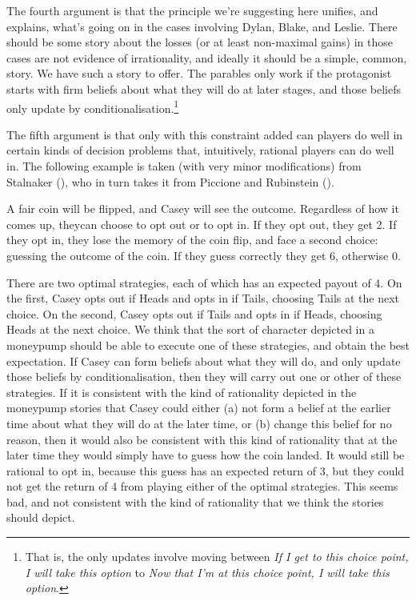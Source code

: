 \documentclass[
  11pt,
  letterpaper,
  DIV=11,
  numbers=noendperiod,
  twoside]{scrartcl}
\begin{document}
The fourth argument is that the principle we're suggesting here unifies,
and explains, what's going on in the cases involving Dylan, Blake, and
Leslie. There should be some story about the losses (or at least
non-maximal gains) in those cases are not evidence of irrationality, and
ideally it should be a simple, common, story. We have such a story to
offer. The parables only work if the protagonist starts with firm
beliefs about what they will do at later stages, and those beliefs only
update by conditionalisation.\footnote{That is, the only updates involve
  moving between \emph{If I get to this choice point, I will take this
  option} to \emph{Now that I'm at this choice point, I will take this
  option}.}

The fifth argument is that only with this constraint added can players
do well in certain kinds of decision problems that, intuitively,
rational players can do well in. The following example is taken (with
very minor modifications) from Stalnaker
(), who in turn takes it from
Piccione and Rubinstein ().

A fair coin will be flipped, and Casey will see the outcome. Regardless
of how it comes up, theycan choose to opt out or to opt in. If they opt
out, they get 2. If they opt in, they lose the memory of the coin flip,
and face a second choice: guessing the outcome of the coin. If they
guess correctly they get 6, otherwise 0.

There are two optimal strategies, each of which has an expected payout
of 4. On the first, Casey opts out if Heads and opts in if Tails,
choosing Tails at the next choice. On the second, Casey opts out if
Tails and opts in if Heads, choosing Heads at the next choice. We think
that the sort of character depicted in a moneypump should be able to
execute one of these strategies, and obtain the best expectation. If
Casey can form beliefs about what they will do, and only update those
beliefs by conditionalisation, then they will carry out one or other of
these strategies. If it is consistent with the kind of rationality
depicted in the moneypump stories that Casey could either (a) not form a
belief at the earlier time about what they will do at the later time, or
(b) change this belief for no reason, then it would also be consistent
with this kind of rationality that at the later time they would simply
have to guess how the coin landed. It would still be rational to opt in,
because this guess has an expected return of 3, but they could not get
the return of 4 from playing either of the optimal strategies. This
seems bad, and not consistent with the kind of rationality that we think
the stories should depict.
\end{document}
